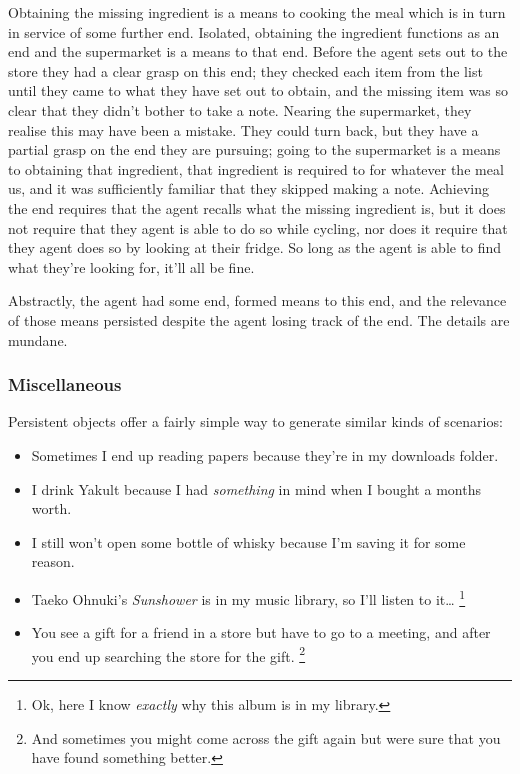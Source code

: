 \documentclass[10pt]{article}
\newcommand{\hozline}[0]{%
  \noindent\hdashrule[0.5ex][c]{\textwidth}{.1pt}{}
}
\newcommand{\hozlinedash}[0]{%
  \noindent\hdashrule[0.5ex][c]{\textwidth}{.1pt}{2.5pt}
}
\begin{document}
Obtaining the missing ingredient is a means to cooking the meal which is in turn in service of some further end.
Isolated, obtaining the ingredient functions as an end and the supermarket is a means to that end.
Before the agent sets out to the store they had a clear grasp on this end; they checked each item from the list until they came to what they have set out to obtain, and the missing item was so clear that they didn't bother to take a note.
Nearing the supermarket, they realise this may have been a mistake.
They could turn back, but they have a partial grasp on the end they are pursuing; going to the supermarket is a means to obtaining that ingredient, that ingredient is required to for whatever the meal us, and it was sufficiently familiar that they skipped making a note.
Achieving the end requires that the agent recalls what the missing ingredient is, but it does not require that they agent is able to do so while cycling, nor does it require that they agent does so by looking at their fridge.
So long as the agent is able to find what they're looking for, it'll all be fine.

Abstractly, the agent had some end, formed means to this end, and the relevance of those means persisted despite the agent losing track of the end.
The details are mundane.

\hozline

\subsubsection*{Miscellaneous}
\label{sec:miscellaneous}

\hozlinedash

Persistent objects offer a fairly simple way to generate similar kinds of scenarios:
\begin{itemize}
\item Sometimes I end up reading papers because they're in my downloads folder.
\item I drink Yakult because I had \emph{something} in mind when I bought a months worth.
\item I still won't open some bottle of whisky because I'm saving it for some reason.
\item Taeko Ohnuki's \emph{Sunshower} is in my music library, so I'll listen to it\dots\nolinebreak
  \footnote{Ok, here I know \emph{exactly} why this album is in my library.}
\item You see a gift for a friend in a store but have to go to a meeting, and after you end up searching the store for the gift.\nolinebreak
  \footnote{And sometimes you might come across the gift again but were sure that you have found something better.}
\end{itemize}
\end{document}
